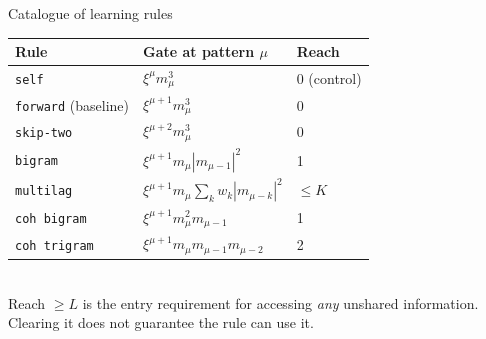 \documentclass[aspectratio=169]{beamer}
\newcommand{\xxi}{\xi}
\newcommand{\mvar}{m}
\begin{document}
\begin{frame}{Catalogue of learning rules}
  \centering
  \small
  \begin{tabular}{lll}
    \toprule
    Rule & Gate at pattern $\mu$ & Reach \\
    \midrule
    \texttt{self} & $\xxi^\mu \mvar_\mu^3$ & 0 (control) \\
    \texttt{forward} (baseline) & $\xxi^{\mu+1} \mvar_\mu^3$ & 0 \\
    \texttt{skip-two} & $\xxi^{\mu+2} \mvar_\mu^3$ & 0 \\
    \texttt{bigram} & $\xxi^{\mu+1} \mvar_\mu |\mvar_{\mu-1}|^2$ & 1 \\
    \texttt{multilag} & $\xxi^{\mu+1} \mvar_\mu \sum_k w_k |\mvar_{\mu-k}|^2$ & $\le K$ \\
    \texttt{coh bigram} & $\xxi^{\mu+1} \mvar_\mu^2 \mvar_{\mu-1}$ & 1 \\
    \texttt{coh trigram} & $\xxi^{\mu+1} \mvar_\mu \mvar_{\mu-1} \mvar_{\mu-2}$ & 2 \\
    \bottomrule
  \end{tabular}
  \\[3mm]
  {\small Reach $\ge L$ is the entry requirement for accessing \emph{any} unshared
  information. Clearing it does not guarantee the rule can use it.}
\end{frame}
\end{document}
